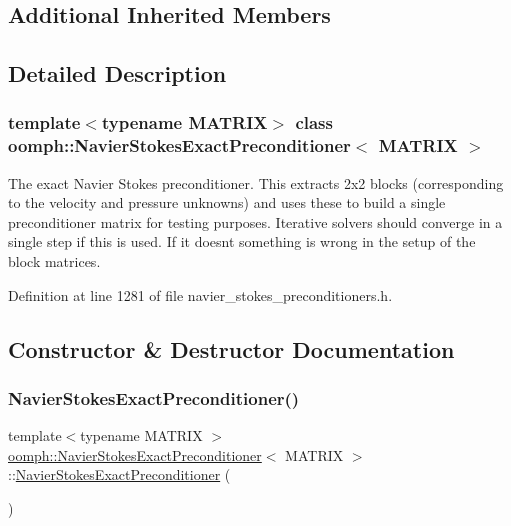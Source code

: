 \subsection*{Additional Inherited Members}


\subsection{Detailed Description}
\subsubsection*{template$<$typename M\+A\+T\+R\+IX$>$\newline
class oomph\+::\+Navier\+Stokes\+Exact\+Preconditioner$<$ M\+A\+T\+R\+I\+X $>$}

The exact Navier Stokes preconditioner. This extracts 2x2 blocks (corresponding to the velocity and pressure unknowns) and uses these to build a single preconditioner matrix for testing purposes. Iterative solvers should converge in a single step if this is used. If it doesn\textquotesingle{}t something is wrong in the setup of the block matrices. 

Definition at line 1281 of file navier\+\_\+stokes\+\_\+preconditioners.\+h.



\subsection{Constructor \& Destructor Documentation}
\mbox{\label{classoomph_1_1NavierStokesExactPreconditioner_ad94bf61083255a8a9304a6dfb88a2ca2}} 
\subsubsection{\texorpdfstring{Navier\+Stokes\+Exact\+Preconditioner()}{NavierStokesExactPreconditioner()}\hspace{0.1cm}{\footnotesize\ttfamily [1/2]}}
{\footnotesize\ttfamily template$<$typename M\+A\+T\+R\+IX $>$ \\
\hyperlink{classoomph_1_1NavierStokesExactPreconditioner}{oomph\+::\+Navier\+Stokes\+Exact\+Preconditioner}$<$ M\+A\+T\+R\+IX $>$\+::\hyperlink{classoomph_1_1NavierStokesExactPreconditioner}{Navier\+Stokes\+Exact\+Preconditioner} (\begin{DoxyParamCaption}{ }\end{DoxyParamCaption})\hspace{0.3cm}{\ttfamily [inline]}}



